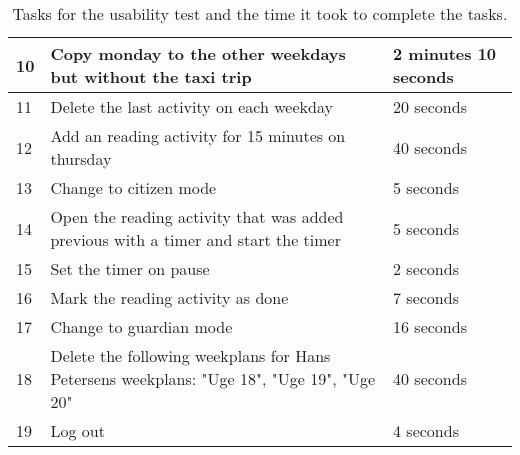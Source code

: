 \begin{table}[H]
\begin{tabular}{|p{1.3cm}|p{10cm}|p{1.7cm}|}
    10 & Copy monday to the other weekdays but without the taxi trip                                                             & 2 minutes 10 seconds     \\ \hline
    11 & Delete the last activity on each weekday                                                                                        & 20 seconds    \\ \hline
    12 & Add an reading activity for 15 minutes on thursday                                                                          & 40 seconds        \\ \hline
    13 & Change to citizen mode                                                                                                       &  5 seconds           \\ \hline
    14 & Open the reading activity that was added previous with a timer and start the timer                                            & 5 seconds        \\ \hline
    15 & Set the timer on pause                                                                                                        & 2 seconds        \\ \hline
    16 & Mark the reading activity as done                                                                                             & 7 seconds         \\ \hline
    17 & Change to guardian mode                                                                                                         & 16 seconds      \\ \hline
    18 & Delete the following weekplans for Hans Petersens weekplans: "Uge 18", "Uge 19", "Uge 20"                                       & 40 seconds   \\ \hline
    19 & Log out                                                                                                                    &  4 seconds                                                                                                             \\ \hline    \end{tabular}
    \caption{Tasks for the usability test and the time it took to complete the tasks.}\label{table:mette_usability_tasks}
\end{table}

\newpage

